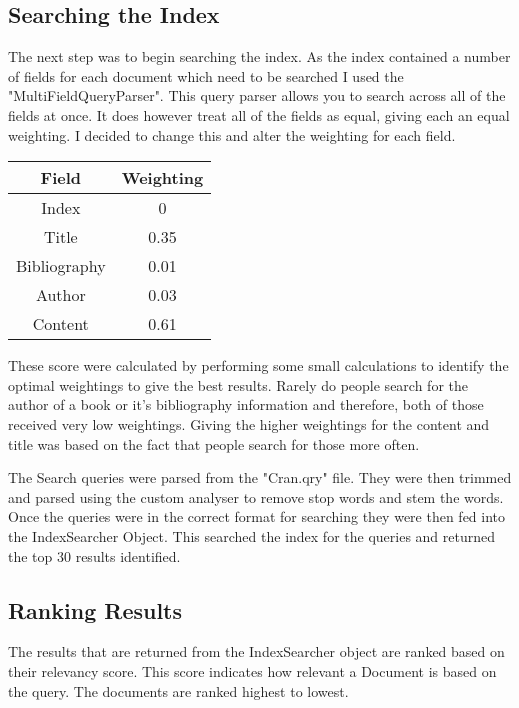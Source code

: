 \documentclass{article}
\begin{document}
\subsection{Searching the Index}
The next step was to begin searching the index. As the index contained a number of fields for each document which need to be searched I used the "MultiFieldQueryParser". This query parser allows you to search across all of the fields at once. It does however treat all of the fields as equal, giving each an equal weighting. I decided to change this and alter the weighting for each field. \par 
\begin{center}
\begin{tabular}{
|| c c ||
}
\hline Field & Weighting \\
\hline\hline
Index & 0\\
\hline
Title & 0.35\\
\hline
Bibliography & 0.01\\
\hline
Author & 0.03\\
\hline
Content & 0.61\\
\hline
\end{tabular}

\end{center}
These score were calculated by performing some small calculations to identify the optimal weightings to give the best results. Rarely do people search for the author of a book or it's bibliography information and therefore, both of those received very low weightings. Giving the higher weightings for the content and title was based on the fact that people search for those more often.
\par 
The Search queries were parsed from the "Cran.qry" file. They were then trimmed and parsed using the custom analyser to remove stop words and stem the words. Once the queries were in the correct format for searching they were then fed into the IndexSearcher Object. This searched the index for the queries and returned the top 30 results identified. 

\subsection{Ranking Results}
The results that are returned from the IndexSearcher object are ranked based on their relevancy score. This score indicates how relevant a Document is based on the query. The documents are ranked highest to lowest.
\end{document}
